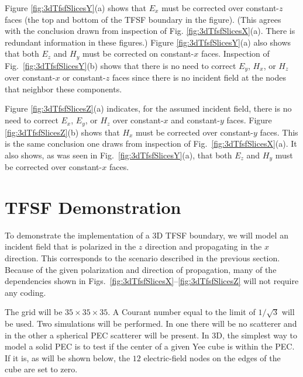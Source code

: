 Figure \ref{fig:3dTfsfSlicesY}(a) shows that $E_x$ must be corrected
over constant-$z$ faces (the top and bottom of the TFSF boundary in
the figure).  (This agrees with the conclusion drawn from inspection
of Fig. \ref{fig:3dTfsfSlicesX}(a).  There is redundant information in
these figures.)  Figure \ref{fig:3dTfsfSlicesY}(a) also shows that
both $E_z$ and $H_y$ must be corrected on constant-$x$ faces.
Inspection of Fig.\ \ref{fig:3dTfsfSlicesY}(b) shows that there is no
need to correct $E_y$, $H_x$, or $H_z$ over constant-$x$ or
constant-$z$ faces since there is no incident field at the nodes that
neighbor these components.

Figure \ref{fig:3dTfsfSlicesZ}(a) indicates, for the assumed incident
field, there is no need to correct $E_x$, $E_y$, or $H_z$ over
constant-$x$ and constant-$y$ faces.  Figure
\ref{fig:3dTfsfSlicesZ}(b) shows that $H_x$ must be corrected over
constant-$y$ faces.  This is the same conclusion one draws from
inspection of Fig.\ \ref{fig:3dTfsfSlicesX}(a). It also shows, as was
seen in Fig.\ \ref{fig:3dTfsfSlicesY}(a), that both $E_z$ and $H_y$
must be corrected over constant-$x$ faces.

\section{TFSF Demonstration}

To demonstrate the implementation of a 3D TFSF boundary, we will model
an incident field that is polarized in the $z$ direction and
propagating in the $x$ direction.  This corresponds to the scenario
described in the previous section.  Because of the given polarization
and direction of propagation, many of the dependencies shown in 
Figs.\ \ref{fig:3dTfsfSlicesX}--\ref{fig:3dTfsfSlicesZ} will not
require any coding.  

The grid will be $35\times 35\times 35$.  A Courant number equal to
the limit of $1/\sqrt{3}$ will be used.  Two simulations will be
performed.  In one there will be no scatterer and in the other a
spherical PEC scatterer will be present.  In 3D, the simplest way to
model a solid PEC is to test if the center of a given Yee cube is
within the PEC.  If it is, as will be shown below, the $12$
electric-field nodes on the edges of the cube are set to zero.

